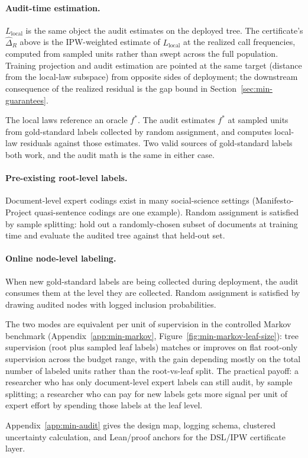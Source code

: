\paragraph{Audit-time estimation.} $L_{\text{local}}$ is the same
object the audit estimates on the deployed tree. The certificate's
$\hat{\Delta}_R$ above is the IPW-weighted estimate of $L_{\text{local}}$
at the realized call frequencies, computed from sampled units rather
than swept across the full population. Training projection and audit
estimation are pointed at the same target (distance from the
local-law subspace) from opposite sides of deployment; the
downstream consequence of the realized residual is the gap bound in
Section~\ref{sec:min-guarantees}.

The local laws reference an oracle $f^*$. The audit estimates $f^*$ at
sampled units from gold-standard labels collected by random assignment,
and computes local-law residuals against those estimates. Two valid
sources of gold-standard labels both work, and the audit math is the
same in either case.

\paragraph{Pre-existing root-level labels.} Document-level expert
codings exist in many social-science settings (Manifesto-Project
quasi-sentence codings are one example). Random assignment is satisfied
by sample splitting: hold out a randomly-chosen subset of documents at
training time and evaluate the audited tree against that held-out set.

\paragraph{Online node-level labeling.} When new gold-standard labels
are being collected during deployment, the audit consumes them at the
level they are collected. Random assignment is satisfied by drawing
audited nodes with logged inclusion probabilities.

The two modes are equivalent per unit of supervision in the controlled
Markov benchmark (Appendix~\ref{app:min-markov},
Figure~\ref{fig:min-markov-leaf-size}): tree supervision (root plus
sampled leaf labels) matches or improves on flat root-only supervision
across the budget range, with the gain depending mostly on the total
number of labeled units rather than the root-vs-leaf split. The
practical payoff: a researcher who has only document-level expert
labels can still audit, by sample splitting; a researcher who can pay
for new labels gets more signal per unit of expert effort by spending
those labels at the leaf level.

Appendix~\ref{app:min-audit} gives the design map, logging schema,
clustered uncertainty calculation, and Lean/proof anchors for the
DSL/IPW certificate layer.
